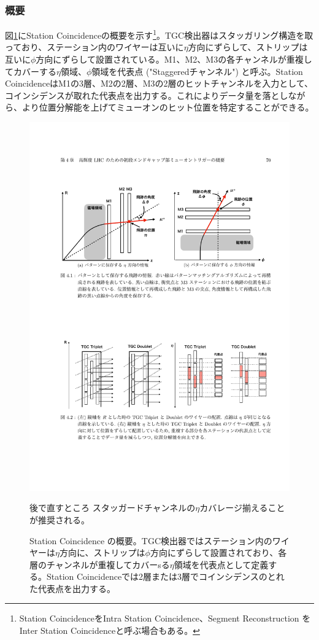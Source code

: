 \subsubsection*{概要}
図\ref{Concept_station}にStation Coincidenceの概要を示す\footnote{Station CoincidenceをIntra Station Coincidence、Segment Reconstruction を Inter Station Coincidenceと呼ぶ場合もある。}。TGC検出器はスタッガリング構造を取っており、ステーション内のワイヤーは互いに$\eta$方向にずらして、ストリップは互いに$\phi$方向にずらして設置されている。M1、M2、M3の各チャンネルが重複してカバーする$\eta$領域、$\phi$領域を代表点 ("Staggeredチャンネル") と呼ぶ。Station CoincidenceはM1の3層、M2の2層、M3の2層のヒットチャンネルを入力として、コインシデンスが取れた代表点を出力する。これによりデータ量を落としながら、より位置分解能を上げてミューオンのヒット位置を特定することができる。

\begin{figure} 
\centering
\includegraphics[width=16cm]{fig/SL/Concept_station.pdf}
\caption[Station コインシデンスの概要]{Station Coincidence の概要\cite{mt_mino}。TGC検出器ではステーション内のワイヤーは$\eta$方向に、ストリップは$\phi$方向にずらして設置されており、各層のチャンネルが重複してカバーsる$\eta$領域を代表点として定義する。Station Coincidenceでは2層または3層でコインシデンスのとれた代表点を出力する。}
\begin{itembox}{後で直すところ}
    スタッガードチャンネルの$\eta$カバレージ揃えることが推奨される。
\end{itembox}
\label{Concept_station}
\end{figure}

